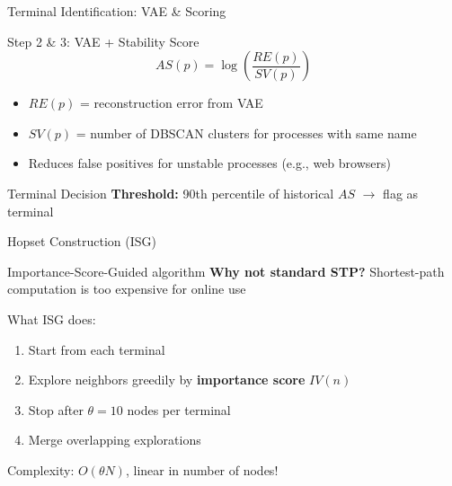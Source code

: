 \documentclass[11pt, aspectratio=169]{beamer}
\begin{document}
\begin{frame}{Terminal Identification: VAE \& Scoring}
    \begin{block}{Step 2 \& 3: VAE + Stability Score}
        \[
        AS(p) = \log\left(\frac{RE(p)}{SV(p)}\right)
        \]
        \begin{itemize}
            \item $RE(p)$ = reconstruction error from VAE
            \item $SV(p)$ = number of DBSCAN clusters for processes with same name
            \item Reduces false positives for unstable processes (e.g., web browsers)
        \end{itemize}
    \end{block}
    
    \begin{block}{Terminal Decision}
        \textbf{Threshold:} 90th percentile of historical $AS$ $\rightarrow$ flag as terminal
    \end{block}
\end{frame}

\begin{frame}{Hopset Construction (ISG)}
    \begin{block}{Importance-Score-Guided algorithm}
        \textbf{Why not standard STP?} Shortest-path computation is too expensive for online use
    \end{block}
    \begin{exampleblock}{What ISG does:}
        \begin{enumerate}
            \item Start from each terminal
            \item Explore neighbors greedily by \textbf{importance score} $IV(n)$
            \item Stop after $\theta = 10$ nodes per terminal
            \item Merge overlapping explorations
        \end{enumerate}
    \end{exampleblock}
    \begin{alertblock}{Complexity: $O(\theta N)$, linear in number of nodes!}
    \end{alertblock}
\end{frame}
\end{document}
